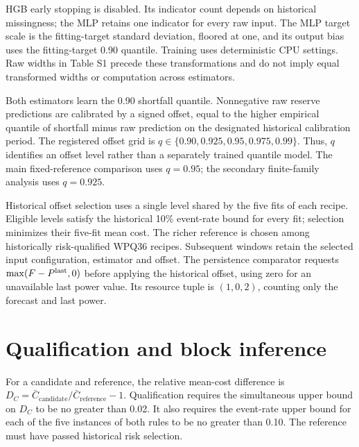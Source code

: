 HGB early stopping is disabled. Its indicator count depends on historical missingness; the MLP retains one indicator for every raw input. The MLP target scale is the fitting-target standard deviation, floored at one, and its output bias uses the fitting-target 0.90 quantile. Training uses deterministic CPU settings. Raw widths in Table S1 precede these transformations and do not imply equal transformed widths or computation across estimators.

Both estimators learn the 0.90 shortfall quantile. Nonnegative raw reserve predictions are calibrated by a signed offset, equal to the higher empirical quantile of shortfall minus raw prediction on the designated historical calibration period. The registered offset grid is $q\in\{0.90,0.925,0.95,0.975,0.99\}$. Thus, $q$ identifies an offset level rather than a separately trained quantile model. The main fixed-reference comparison uses $q=0.95$; the secondary finite-family analysis uses $q=0.925$.

Historical offset selection uses a single level shared by the five fits of each recipe. Eligible levels satisfy the historical 10\% event-rate bound for every fit; selection minimizes their five-fit mean cost. The richer reference is chosen among historically risk-qualified WPQ36 recipes. Subsequent windows retain the selected input configuration, estimator and offset. The persistence comparator requests $\max(F-P^{\rm last},0)$ before applying the historical offset, using zero for an unavailable last power value. Its resource tuple is $(1,0,2)$, counting only the forecast and last power.

\section{Qualification and block inference}
For a candidate and reference, the relative mean-cost difference is $D_C=\bar C_{\mathrm{candidate}}/\bar C_{\mathrm{reference}}-1$. Qualification requires the simultaneous upper bound on $D_C$ to be no greater than 0.02. It also requires the event-rate upper bound for each of the five instances of both rules to be no greater than 0.10. The reference must have passed historical risk selection.

